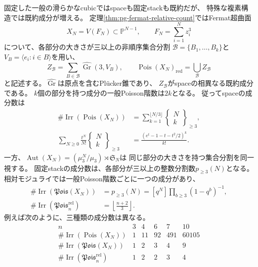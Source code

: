固定した一般の滑らかなcubicではspaceも固定stackも既約だが、
特殊な複素構造では既約成分が増える。
定理\ref{thm:pg-fermat-relative-count}ではFermat超曲面
\begin{equation}\label{eq:intro-fermat-equation}
 X_N=V(F_N)\subset\mathbb P^{N-1},\qquad F_N=\sum_{i=1}^Nz_i^3
\end{equation}
について、各部分の大きさが三以上の非順序集合分割
$\mathcal B=\{B_1,\ldots,B_k\}$と
$V_B=\langle e_i:i\in B\rangle$を用い、
\begin{equation}\label{eq:intro-fermat-components}
 Z_{\mathcal B}=\sum_{B\in\mathcal B}\widehat{\operatorname{Gr}}(3,V_B),
 \qquad \operatorname{Pois}(X_N)_{\mathrm{red}}
 =\bigcup_{\mathcal B}Z_{\mathcal B}
\end{equation}
と記述する。$\widehat{\operatorname{Gr}}$は原点を含むPl\"ucker錐であり、
$Z_{\mathcal B}$がspaceの相異なる既約成分である。
$k$個の部分を持つ成分の一般Poisson階数は$2k$となる。
従ってspaceの成分数は
\begin{equation}\label{eq:intro-fermat-space-count}
 \begin{aligned}
 \#\operatorname{Irr}(\operatorname{Pois}(X_N))
 &=\sum_{k=1}^{\lfloor N/3\rfloor}
 \left\{\begin{smallmatrix}N\\k\end{smallmatrix}\right\}_{\ge3},\\
 \sum_{N\ge0}\frac{t^N}{N!}
 \left\{\begin{smallmatrix}N\\k\end{smallmatrix}\right\}_{\ge3}
 &=\frac{(e^t-1-t-t^2/2)^k}{k!}.
 \end{aligned}
\end{equation}
一方、$\operatorname{Aut}(X_N)=(\mu_3^N/\mu_3)\rtimes\mathfrak S_N$は
同じ部分の大きさを持つ集合分割を同一視する。
固定stackの成分数は、各部分が三以上の整数分割数$p_{\ge3}(N)$となる。
相対モジュライでは一般Poisson階数ごとに一つの成分があり、
\begin{equation}\label{eq:intro-poisson-stack-counts}
 \begin{aligned}
 \#\operatorname{Irr}(\mathfrak{Pois}(X_N))
 &=p_{\ge3}(N)=[q^N]\prod_{b\ge3}(1-q^b)^{-1},\\
 \#\operatorname{Irr}(\mathfrak{Pois}^{\mathrm{rel}}_n)
 &=\left\lfloor\frac{n+2}{3}\right\rfloor.
 \end{aligned}
\end{equation}
例えば次のように、三種類の成分数は異なる。
\begin{equation}\label{eq:intro-poisson-count-table}
 \begin{array}{c|rrrrr}
 n&3&4&6&7&10\\\hline
 \#\operatorname{Irr}(\operatorname{Pois}(X_N))&1&11&92&491&60105\\
 \#\operatorname{Irr}(\mathfrak{Pois}(X_N))&1&2&3&4&9\\
 \#\operatorname{Irr}(\mathfrak{Pois}^{\mathrm{rel}}_n)&1&2&2&3&4
 \end{array}
\end{equation}
